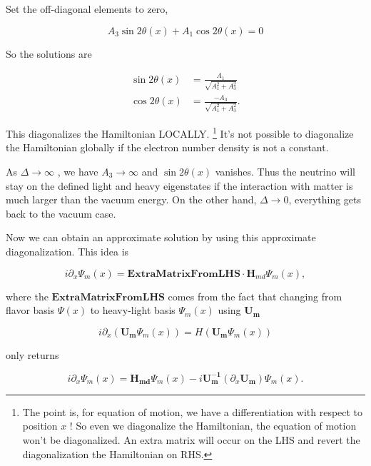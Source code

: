 \documentclass{tufte-handout}
\begin{document}
Set the off-diagonal elements to zero,

\begin{equation*}
A_3 \sin 2\theta(x) + A_1 \cos 2\theta(x)  = 0
\end{equation*}

So the solutions are

\begin{align*}
\sin 2\theta(x) & = \frac{A_1}{\sqrt{A_1^2 + A_3^2}} \\
\cos 2\theta(x) & = \frac{-A_3}{\sqrt{A_1^2+A_3^2}}.
\end{align*}

This diagonalizes the Hamiltonian LOCALLY. \footnote{The point is, for equation of motion, we have a differentiation with respect to position  $x$ ! So even we diagonalize the Hamiltonian, the equation of motion won't be diagonalized. An extra matrix will occur on the LHS and revert the diagonalization the Hamiltonian on RHS.
} It's not possible to diagonalize the Hamiltonian globally if the electron number density is not a constant.



As  $\Delta \to \infty$ ,  we have $A_3\to \infty$ and  $\sin 2\theta(x)$ vanishes. Thus the neutrino will stay on the defined light and heavy eigenstates if the interaction with matter is much larger than the vacuum energy. On the other hand, $\Delta \to 0$, everything gets back to the vacuum case.

Now we can obtain an approximate solution by using this approximate diagonalization. This idea is

\begin{equation*}
i \partial_x \Psi_m(x) = \mathbf{Extra Matrix From LHS}\cdot \mathbf H_{md} \Psi_m(x),
\end{equation*}

where the $\mathbf{Extra Matrix From LHS}$ comes from the fact that changing from flavor basis $\Psi(x)$ to heavy-light basis $\Psi_m(x)$ using $\mathbf {U_m}$

\begin{equation*}
i\partial_x (\mathbf{U_m} \Psi_m(x)) = H ( \mathbf{U_m} \Psi_m(x) )
\end{equation*}

only returns

\begin{equation*}
i\partial_x \Psi_m(x) = \mathbf{H_{md} } \Psi_m(x) - i \mathbf{U_m^{-1}} ( \partial_x \mathbf{U_m} ) \Psi_m(x).
\end{equation*}
\end{document}
